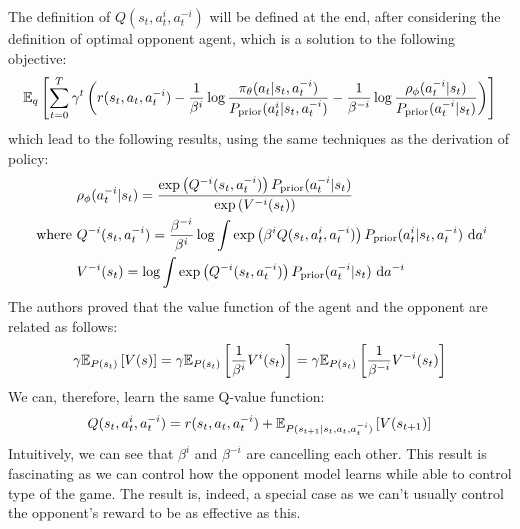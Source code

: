 The definition of $Q(s_t, a^i_t, a^{-i}_t)$ will be defined at the end, after considering the definition of optimal opponent agent, which is a solution to the following objective:
\begin{equation}
    \mathbb{E}_q\left[ \sum^T_{t=0} \gamma^t \left( r(s_t, a_t, a^{-i}_t) - \frac{1}{\beta^i} \log\frac{\pi_{\theta}(a_t|s_t, a^{-i}_t)}{P_{\text{prior}}(a^i_t|s_t, a^{-i}_t)} - \frac{1}{\beta^{-i}}\log \frac{\rho_\phi(a^{-i}_t | s_t)}{P_{\text{prior}}(a^{-i}_t | s_t)} \right) \right]
\end{equation}
which lead to the following results, using the same techniques as the derivation of policy:
\begin{equation}
\begin{aligned}
    &\rho_{\phi}(a^{-i}_t|s_t) = \frac{ \exp\left( Q^{-i}(s_t, a^{-i}_t) \right)P_{\text{prior}}(a^{-i}_t|s_t)} {\exp\left( V^{-i}(s_t) \right)} \\
    \text{ where }&Q^{-i}(s_t, a^{-i}_t) = \frac{\beta^{-i}}{\beta^{i}} \log \int \exp\left( \beta^{i} Q(s_t, a^i_t, a^{-i}_t) \right) P_{\text{prior}}(a^{i}_t|s_t, a^{-i}_t) \ \mathrm{d} a^{i}  \\
    &V^{-i}(s_t) = \log \int \exp\left( Q^{-i}(s_t, a^{-i}_t) \right)P_{\text{prior}}(a^{-i}_t|s_t) \ \mathrm{d} a^{-i}  \\
\end{aligned}
\end{equation}
The authors \cite{grau2018balancing} proved that the value function of the agent and the opponent are related as follows:
\begin{equation}
\label{eqn:chap3-balance-value-equivalent}
    \gamma\mathbb{E}_{P(s_t)}\left[ V(s) \right] = \gamma \mathbb{E}_{P(s_t)}\left[ \frac{1}{\beta^i} V^i(s_t) \right] = \gamma\mathbb{E}_{P(s_t)}\left[ \frac{1}{\beta^{-i}} V^{-i}(s_t) \right]
\end{equation}
We can, therefore, learn the same Q-value function:
\begin{equation}
\label{eqn:chap3-balance-bellman}
    Q(s_t, a^i_t, a^{-i}_t) = r(s_t, a_t, a^{-i}_t) + \mathbb{E}_{P(s_{t+1} | s_t, a_t, a^{-i}_t)}\left[ V(s_{t+1}) \right]
\end{equation}
Intuitively, we can see that $\beta^i$ and $\beta^{-i}$ are cancelling each other. This result is fascinating as we can control how the opponent model learns while able to control  type of the game. The result is, indeed, a special case as we can't usually control the opponent's reward to be as effective as this. 

